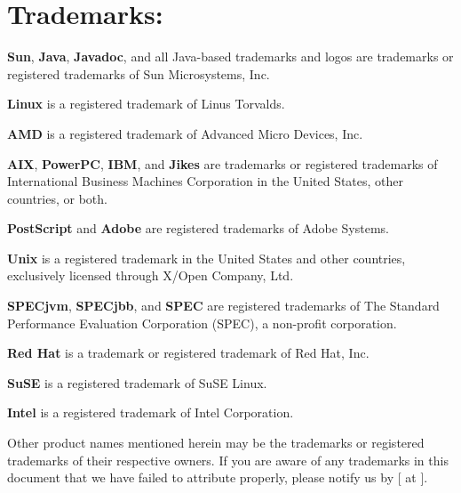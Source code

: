 \section*{Trademarks:}
\label{trademarks}

{\bf Sun}, {\bf Java}, {\bf Javadoc}, and all Java-based trademarks
and logos are trademarks or registered trademarks of Sun Microsystems,
Inc. 

{\bf Linux} is a registered trademark of Linus Torvalds.

{\bf AMD} is a registered trademark of Advanced Micro Devices, Inc.\@

{\bf AIX}, {\bf PowerPC}, {\bf IBM}, and {\bf Jikes} are
trademarks or 
registered trademarks of International Business Machines Corporation in the
United States, other countries, or both.

{\bf PostScript} and {\bf Adobe} are registered trademarks of Adobe Systems.

{\bf Unix} is a registered trademark in the United States and other
countries, exclusively licensed through X/Open Company, Ltd.

{\bf SPECjvm}, {\bf SPECjbb}, and {\bf SPEC} are registered
trademarks of The Standard Performance Evaluation Corporation (SPEC),
a non-profit corporation. 

{\bf Red Hat} is a trademark or registered trademark of Red Hat, Inc.

{\bf SuSE} is a registered trademark of SuSE Linux.

{\bf Intel} is a registered trademark of Intel Corporation.

Other product names mentioned herein may be the trademarks or
registered trademarks of their respective owners.  If you are aware of
any trademarks in this document that we have failed to attribute
properly, please notify us by [ at {\tt \RVMBugURL}]{\RVMBugURL}.

